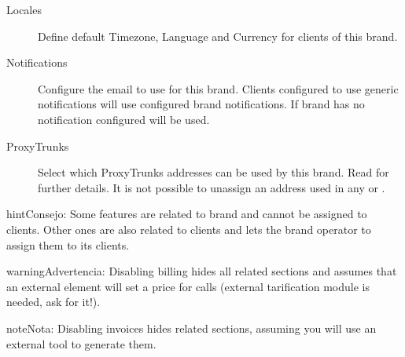 \documentclass[letterpaper,10pt,spanish]{sphinxmanual}
\begin{document}
\begin{description}
\item[{Locales}] \leavevmode{}\label{administration_portal/platform/brands:term-locales}
Define default Timezone, Language and Currency for clients of this brand.

\item[{Notifications}] \leavevmode{}\label{administration_portal/platform/brands:term-notifications}
Configure the email {\hyperref[administration_portal/brand/settings/notification_templates:notification\string-templates]{}} to use for this brand.
Clients configured to use generic notifications will use configured
brand notifications. If brand has no notification configured
{\hyperref[administration_portal/platform/default_notification_templates:default\string-notification\string-templates]{}} will be used.

\item[{ProxyTrunks}] \leavevmode{}\label{administration_portal/platform/brands:term-proxytrunks}
Select which ProxyTrunks addresses can be used by this brand. Read {\hyperref[administration_portal/platform/infrastructure/proxy_trunks:proxy\string-trunks]{}}
for further details. It is not possible to unassign an address used in any {\hyperref[administration_portal/brand/providers/carriers:carriers]{}} or
{\hyperref[administration_portal/brand/providers/ddi_providers:ddi\string-providers]{}}.

\end{description}

\begin{notice}{hint}{Consejo:}
Some features are related to brand and cannot be assigned to clients.
Other ones are also related to clients and lets the brand operator to
assign them to its clients.
\end{notice}

\begin{notice}{warning}{Advertencia:}
Disabling billing hides all related sections and assumes that an
external element will set a price for calls (external tarification
module is needed, ask for it!).
\end{notice}

\begin{notice}{note}{Nota:}
Disabling invoices hides related sections, assuming you will use an
external tool to generate them.
\end{notice}
\end{document}
